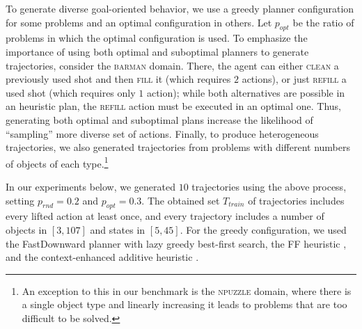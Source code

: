 \documentclass{article}
\theoremstyle{definition}
\theoremstyle{remark}
\newcommand{\T}{T}
\newcommand{\Ttrain}{\T_{train}}
\newif\ifaddcomments
\newcommand{\roni}[1]{\ifaddcomments{\textcolor{red}{[Roni: #1]}}\fi}
\newcommand{\leo}[1]{\ifaddcomments{\textcolor{pink}{[Leonardo: #1]}}\fi}
\begin{document}
To generate diverse goal-oriented behavior, we use a greedy planner configuration for some problems and an optimal configuration in others. 
Let $p_{opt}$ be the ratio of problems in which the optimal configuration is used. 
To emphasize the importance of using both optimal and suboptimal planners to generate trajectories, consider the \textsc{barman} domain. 
There, the agent can either \textsc{clean} a previously used shot and then \textsc{fill} it (which requires $2$ actions), or just \textsc{refill} a used shot (which requires only $1$ action); while both alternatives are possible in an heuristic plan, the \textsc{refill} action must be executed in an optimal one. 
Thus, generating both optimal and suboptimal plans increase the likelihood of ``sampling'' more diverse set of actions. 
Finally, to produce heterogeneous trajectories, we also generated trajectories from problems with different numbers of objects of each type.\footnote{An exception to this in our benchmark is the \textsc{npuzzle} domain, where there is a single object type and linearly increasing it leads to problems that are too difficult to be solved.} 


%


In our experiments below, we generated $10$ trajectories using the above process, 
setting $p_{rnd}=0.2$ and $p_{opt}=0.3$. 
The obtained set $\Ttrain$ of trajectories includes every lifted action at least once, and every trajectory includes a number of objects in $[3, 107]$ and states in $[5, 45]$. %
For the greedy configuration, we used the FastDownward planner \citep{helmert2006fast} with lazy greedy best-first search, the
FF heuristic \citep{hoffmann2001ff}, and the context-enhanced additive heuristic \citep{helmert2008unifying}. \roni{@Leonardo: what was the optimal configuration?} \leo{Astar with landmark optimal cut heuristic}





\end{document}
